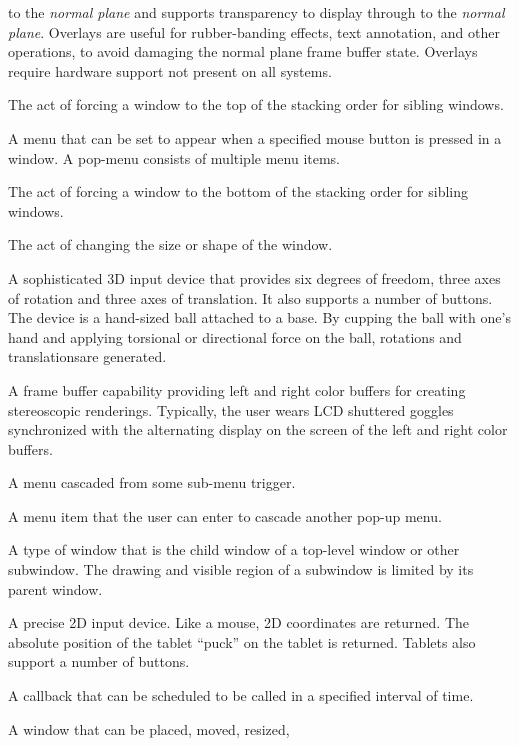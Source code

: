 \documentclass[titlepage,twoside]{article}
\begin{document}
\begin{description}
to the {\em normal plane} and supports transparency to display through to the
{\em normal plane}.  Overlays are useful for rubber-banding effects, text
annotation, and other operations, to avoid damaging the normal plane frame
buffer state.  Overlays require hardware support not present on all systems.
\item[{\em \ndx{Pop}}]  The act of forcing a window to the top of the
stacking order for sibling windows.
\item[{\em \ndx{Pop-up menu}}]  A menu that can be set to appear when a specified
mouse button is pressed in a window.  A pop-menu consists of multiple
menu items.
\item[{\em \ndx{Push}}]  The act of forcing a window to the bottom of the
stacking order for sibling windows.
\item[{\em \ndx{Reshape}}]  The act of changing the size or shape of the window.
\item[{\em \ndx{Spaceball}}]  A sophisticated 3D input device that provides 
six degrees of freedom, three axes of rotation and three axes of
translation.  It also supports a number
of buttons.  The device is a hand-sized ball attached to a base.  By
cupping the ball with one's hand and applying torsional or directional force
on the ball, rotations and translationsare generated.
\item[{\em \ndx{Stereo}}]  A frame buffer capability providing left
  and right color buffers for creating stereoscopic renderings.  Typically,
  the user wears LCD shuttered goggles synchronized with the alternating
  display on the screen of the left and right color buffers.
\item[{\em \ndx{Sub-menu}}]  A menu cascaded from some sub-menu trigger.
\item[{\em \ndx{Sub-menu trigger}}]  A menu item that the user can enter to
cascade another pop-up menu.
\item[{\em \ndx{Subwindow}}]  A type of window that is the child window of
a top-level window or other subwindow.  The drawing and visible region
of a subwindow is limited by its parent window.
\item[{\em \ndx{Tablet}}]  A precise 2D input device.  Like
a mouse, 2D coordinates are returned.  The absolute position of the
tablet ``puck'' on the tablet is returned.  Tablets also support
a number of buttons.
\item[{\em \ndx{Timer}}]  A callback that can be scheduled to be called in
a specified interval of time.
\item[{\em \ndx{Top-level window}}]  A window that can be placed, moved, resized,

\end{description}
\end{document}
